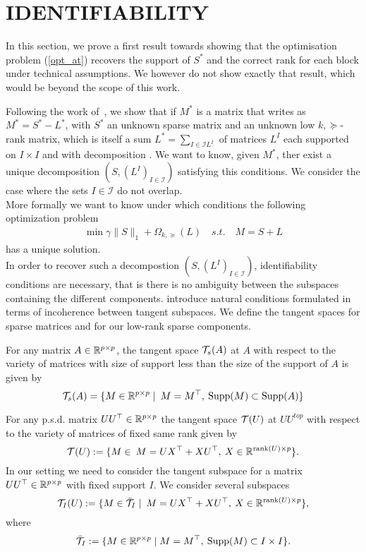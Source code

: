 \section{IDENTIFIABILITY}
\label{sec:id}

In this section, we prove a first result towards showing that the optimisation problem (\ref{opt_at}) recovers the support of $S^*$ and the correct rank for each block under technical assumptions. We however do not show exactly that result, which would be beyond the scope of this work. 

Following the work of~\citet{chandrasekaran2011rank}, we show that if  $M^{\ast}$ is a matrix that writes as  $M^{\ast}= S^{\ast}-L^{\ast}$, with $S^{\ast}$ an unknown sparse matrix and an unknown  low $k,\succeq$-rank matrix, which is itself a sum $L^{\ast}=\sum_{I\in\mathcal{I}L^{I}}$ of matrices $L^{I}$ each supported on $I \times I$ and with decomposition . We want to know, given $M^{\ast}$, ther exist a unique decomposition $\left(S,(L^{I})_{I\in\mathcal{I}}\right)$ satisfying this conditions. We consider the case where the sets $I\in\mathcal{I}$ do not overlap.  \\

More formally we want to know under which conditions the following optimization problem 
\begin{align}
\min \gamma\|S\|_1+\Omega_{k,\succeq}(L) \quad s.t. \quad M=S+L
\end{align}
has a unique solution.\\

In order to recover such a decompostion  $\left(S,(L^{I})_{I\in\mathcal{I}}\right)$, identifiability conditions are necessary, that is there is no ambiguity between the subspaces containing the different components.  \citet{chandrasekaran2011rank} introduce natural conditions formulated in terms of incoherence between tangent subspaces. We define the tangent spaces for sparse matrices and for our low-rank sparse components.

For any matrix $A\in\mathbb{R}^{p\times p}$, the tangent space $\mathcal{T}_s(A)$ at $A$ with respect to the variety of matrices with size of support less than the size of the support of $A$ is given by
$$
\mathcal{T}_s(A)=\{M \in \mathbb{R}^{p \times p}\mid  \: M=M^\top, \: {\rm Supp}(M)\subset {\rm Supp}(A)\}
$$

For any p.s.d. matrix $UU^{\top}\in\mathbb{R}^{p\times p}$  the tangent space $\mathcal{T}(U)$ at $UU^{top}$ with respect to the variety of matrices of fixed same rank given by
$$
\mathcal{T}(U):=\{M \in \: M=UX^\top+XU^\top,\: X \in \mathbb{R}^{\text{rank}(U) \times p} \}.
$$
In our setting we need to consider the tangent subspace for a matrix $UU^{\top}\in\mathbb{R}^{p\times p}$ with fixed support $I$.
We consider several subspaces
$$\mathcal{T}_I(U):=\{M \in \bar{\mathcal{T}}_I\mid \: M=UX^\top+XU^\top,\: X \in \mathbb{R}^{\text{rank}(U) \times p} \},$$
where 
$$
\bar{\mathcal{T}}_I:=\{M \in \mathbb{R}^{p \times p}\mid  M=M^\top, \: {\rm Supp}(M)\subset I \times I\}.
$$

